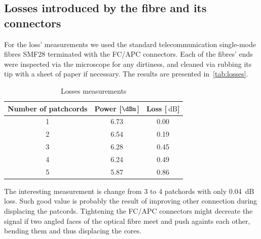 


\subsection{Losses introduced by the fibre and its connectors}

For the loss' measurements we used the standard telecommunication single-mode fibres SMF28 terminated with the FC/APC connectors.
Each of the fibres' ends were inspected via the microscope for any dirtiness, and cleaned via rubbing its tip with a sheet of paper if necessary. 
The results are presented in~\autoref{tab:losses}.
\begin{table}
    \centering
    \begin{tabular}{c|c|c}
        Number of patchcords & Power [$\qty{}{\dBm}$] & Loss [$\qty{}{\dB}$]\\
        \hline\hline
        1 & 6.73 & 0.00 \\
        2 & 6.54 & 0.19 \\
        3 & 6.28 & 0.45 \\
        4 & 6.24 & 0.49 \\
        5 & 5.87 & 0.86
    \end{tabular}
    \caption{Losses measurements}
    \label{tab:losses}
\end{table}

The interesting measurement is change from 3 to 4 patchords with only \qty{0.04}{\dB} loss.
Such good value is probably the result of improving other connection during displacing the patcords.
Tightening the FC/APC connectors might decreate the signal if two angled faces of the optical fibre meet and push againts each other, bending them and thus displacing the cores.

